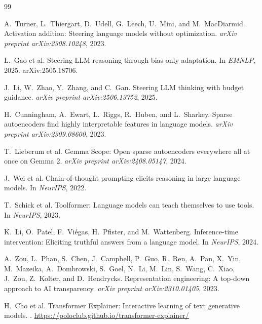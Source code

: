 \documentclass[11pt,a4paper]{article}
\begin{document}

\begin{thebibliography}{99}

A.~Turner, L.~Thiergart, D.~Udell, G.~Leech, U.~Mini, and M.~MacDiarmid.
\newblock Activation addition: Steering language models without optimization.
\newblock \textit{arXiv preprint arXiv:2308.10248}, 2023.

L.~Gao et al.
\newblock Steering {LLM} reasoning through bias-only adaptation.
\newblock In \textit{EMNLP}, 2025.
\newblock arXiv:2505.18706.

J.~Li, W.~Zhao, Y.~Zhang, and C.~Gan.
\newblock Steering {LLM} thinking with budget guidance.
\newblock \textit{arXiv preprint arXiv:2506.13752}, 2025.

H.~Cunningham, A.~Ewart, L.~Riggs, R.~Huben, and L.~Sharkey.
\newblock Sparse autoencoders find highly interpretable features in language models.
\newblock \textit{arXiv preprint arXiv:2309.08600}, 2023.

T.~Lieberum et al.
\newblock Gemma {S}cope: Open sparse autoencoders everywhere all at once on {G}emma 2.
\newblock \textit{arXiv preprint arXiv:2408.05147}, 2024.

J.~Wei et al.
\newblock Chain-of-thought prompting elicits reasoning in large language models.
\newblock In \textit{NeurIPS}, 2022.

T.~Schick et al.
\newblock Toolformer: Language models can teach themselves to use tools.
\newblock In \textit{NeurIPS}, 2023.

K.~Li, O.~Patel, F.~Vi\'{e}gas, H.~Pfister, and M.~Wattenberg.
\newblock Inference-time intervention: Eliciting truthful answers from a language model.
\newblock In \textit{NeurIPS}, 2024.

A.~Zou, L.~Phan, S.~Chen, J.~Campbell, P.~Guo, R.~Ren, A.~Pan, X.~Yin, M.~Mazeika, A.~Dombrowski, S.~Goel, N.~Li, M.~Lin, S.~Wang, C.~Xiao, J.~Zou, Z.~Kolter, and D.~Hendrycks.
\newblock Representation engineering: A top-down approach to {AI} transparency.
\newblock \textit{arXiv preprint arXiv:2310.01405}, 2023.

H.~Cho et al.
\newblock Transformer {E}xplainer: Interactive learning of text generative models.
.
\newblock \url{https://poloclub.github.io/transformer-explainer/}


\end{thebibliography}
\end{document}
